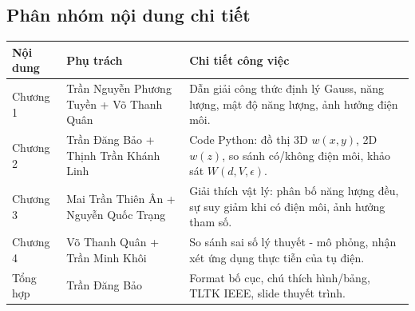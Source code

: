 \begin{landscape}
\vspace{0.8cm}

\subsection{Phân nhóm nội dung chi tiết}
\thispagestyle{empty}
\begin{center}
\renewcommand{\arraystretch}{1.5}
\begin{tabular}{|l|l|p{14cm}|} 
\hline
\textbf{Nội dung} & \textbf{Phụ trách} & \textbf{Chi tiết công việc} \\ \hline
Chương 1 & Trần Nguyễn Phương Tuyền + Võ Thanh Quân & Dẫn giải công thức định lý Gauss, năng lượng, mật độ năng lượng, ảnh hưởng điện môi. \\ \hline
Chương 2 & Trần Đăng Bảo + Thịnh Trần Khánh Linh & Code Python: đồ thị 3D $w(x,y)$, 2D $w(z)$, so sánh có/không điện môi, khảo sát $W(d, V, \epsilon)$. \\ \hline
Chương 3 & Mai Trần Thiên Ân + Nguyễn Quốc Trạng & Giải thích vật lý: phân bố năng lượng đều, sự suy giảm khi có điện môi, ảnh hưởng tham số. \\ \hline
Chương 4 & Võ Thanh Quân + Trần Minh Khôi & So sánh sai số lý thuyết - mô phỏng, nhận xét ứng dụng thực tiễn của tụ điện. \\ \hline
Tổng hợp & Trần Đăng Bảo & Format bố cục, chú thích hình/bảng, TLTK IEEE, slide thuyết trình. \\ \hline
\end{tabular}
\end{center}

\end{landscape}
